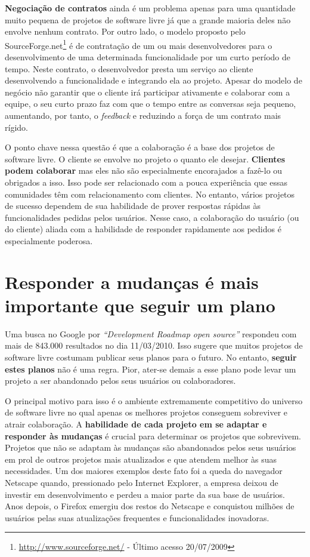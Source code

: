 \textbf{Negociação de contratos} ainda é um problema apenas para uma
quantidade muito pequena de projetos de software livre já que a grande
maioria deles não envolve nenhum contrato.  Por outro lado, o modelo
proposto pelo SourceForge.net\footnote{\url{http://www.sourceforge.net/} -
  Último acesso 20/07/2009} é de contratação de um ou mais
desenvolvedores para o desenvolvimento de uma determinada
funcionalidade por um curto período de tempo. Neste contrato, o
desenvolvedor presta um serviço ao cliente desenvolvendo a
funcionalidade e integrando ela ao projeto. Apesar do modelo de
negócio não garantir que o cliente irá participar ativamente e
colaborar com a equipe, o seu curto prazo faz com que o tempo entre as
conversas seja pequeno, aumentando, por tanto, o \emph{feedback} e
reduzindo a força de um contrato mais rígido.

O ponto chave nessa questão é que a colaboração é a base dos projetos
de software livre.  O cliente se envolve no projeto o quanto ele
desejar. \textbf{Clientes podem colaborar} mas eles não são
especialmente encorajados a fazê-lo ou obrigados a isso. Isso pode ser
relacionado com a pouca experiência que essas comunidades têm com
relacionamento com clientes. No entanto, vários projetos de sucesso
dependem de sua habilidade de prover respostas rápidas às
funcionalidades pedidas pelos usuários. Nesse caso, a colaboração do
usuário (ou do cliente) aliada com a habilidade de responder
rapidamente aos pedidos é especialmente poderosa.

\section{Responder a mudanças é mais importante que seguir um plano}
\label{sec:fourth-princ}

Uma busca no Google por \emph{``Development Roadmap open source''}
respondeu com mais de 843.000 resultados no dia 11/03/2010. Isso
sugere que muitos projetos de software livre costumam publicar seus
planos para o futuro. No entanto, \textbf{seguir estes planos} não é
uma regra. Pior, ater-se demais a esse plano pode levar um projeto a
ser abandonado pelos seus usuários ou colaboradores.

O principal motivo para isso é o ambiente extremamente competitivo do
universo de software livre no qual apenas os melhores projetos
conseguem sobreviver e atrair colaboração. A \textbf{habilidade de
  cada projeto em se adaptar e responder às mudanças} é crucial para
determinar os projetos que sobrevivem.  Projetos que não se adaptam às
mudanças são abandonados pelos seus usuários em prol de outros
projetos mais atualizados e que atendem melhor às suas necessidades.
Um dos maiores exemplos deste fato foi a queda do navegador Netscape
quando, pressionado pelo Internet Explorer, a empresa deixou de
investir em desenvolvimento e perdeu a maior parte da sua base de
usuários. Anos depois, o Firefox emergiu dos restos do Netscape e
conquistou milhões de usuários pelas suas atualizações frequentes e
funcionalidades inovadoras.

